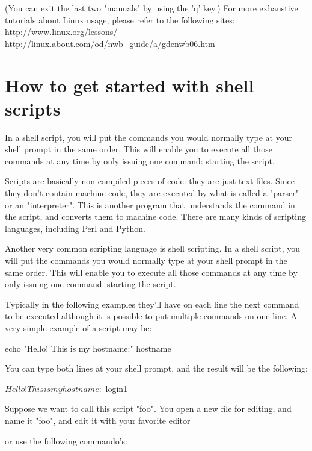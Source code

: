 (You can exit the last two "manuals" by using the 'q' key.)
For more exhaustive tutorials about Linux usage, please refer to the following sites:
http://www.linux.org/lessons/
http://linux.about.com/od/nwb\_guide/a/gdenwb06.htm


\section{How to get started with shell scripts}

In a shell script, you will put the commands you would normally type at your shell prompt in the same order. This will enable you to execute all those commands at any time by only issuing one command: starting the script.

Scripts are basically non-compiled pieces of code: they are just text files. Since they don't contain machine code, they are executed by what is called a "parser" or an "interpreter". This is another program that understands the command in the script, and converts them to machine code. There are many kinds of scripting languages, including Perl and Python.

Another very common scripting language is shell scripting. In a shell script, you will put the commands you would normally type at your shell prompt in the same order. This will enable you to execute all those commands at any time by only issuing one command: starting the script.

Typically in the following examples they'll have on each line the next command to be executed although it is possible to put multiple commands on one line. A very simple example of a script may be:

\begin{prog}
echo "Hello! This is my hostname:"
hostname
\end{prog}

You can type both lines at your shell prompt, and the result will be the following:
\begin{prompt}
$ %
Hello! This is my hostname:
$ %
login1
\end{prompt}

Suppose we want to call this script "foo". You open a new file for editing, and name it "foo", and edit it with your favorite editor
\begin{prompt}
$ %
\end{prompt}

or use the following commando's:
\begin{prompt}
$ %
$ %
\end{prompt}

